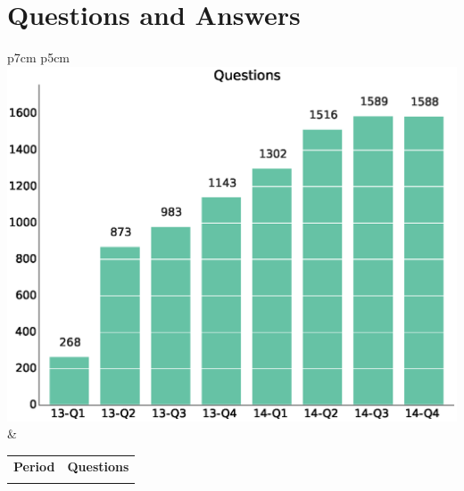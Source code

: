\documentclass[a4wide,11pt]{report}
\begin{document}

\section{Questions and Answers}

\begin{tabular}{p{7cm} p{5cm}}
    \vspace{0pt} 
    \includegraphics[scale=.35]{figs/questions.eps}
    & 
    \vspace{0pt}
    \begin{tabular}{l|l}%
    \bfseries Period & \bfseries Questions %
    \csvreader[head to column names]{data/questions.csv}{}%
    {\\ & \questions}
    \end{tabular}
\end{tabular}
\end{document}
